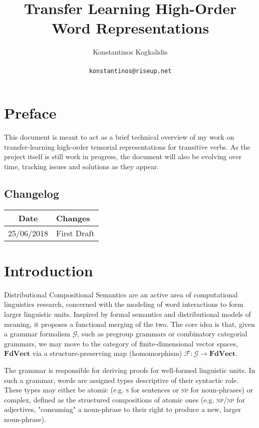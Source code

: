 \documentclass[a4paper,11pt]{article}
\title{Transfer Learning High-Order Word Representations}
\date{}
\author{Konstantinos Kogkalidis\\
       \\
       \texttt{konstantinos@riseup.net}
}
\begin{document}
\maketitle

\section{Preface}
This document is meant to act as a brief technical overview of my work on transfer-learning high-order tensorial representations for transitive verbs. As the project itself is still work in progress, the document will also be evolving over time, tracking issues and solutions as they appear. 

\subsection{Changelog}
    \begin{tabularx}{\linewidth}{|c|X|}
      \toprule
      \textbf{Date} & \textbf{Changes} \\
      \midrule
      {25/06/2018} &  {First Draft} \\
    \end{tabularx}
    
\section{Introduction}
Distributional Compositional Semantics are an active area of computational linguistics research, concerned with the modeling of word interactions to form larger linguistic units. Inspired by formal semantics and distributional models of meaning, it proposes a functional merging of the two. The core idea is that, given a grammar formalism $\mathcal{G}$, such as pregroup grammars or combinatory categorial grammars, we may move to the category of finite-dimensional vector spaces, $\mathbf{FdVect}$ via a structure-preserving map (homomorphism) $\mathcal{F}: \mathcal{G} \to \mathbf{FdVect}$.

The grammar is responsible for deriving proofs for well-formed linguistic units. In such a grammar, words are assigned types descriptive of their syntactic role. These types may either be atomic (e.g. \textsc{s} for sentences or \textsc{np} for noun-phrases) or complex, defined as the structured compositions of atomic ones (e.g. \textsc{np}/\textsc{np} for adjectives, "consuming" a noun-phrase to their right to produce a new, larger noun-phrase).
\end{document}
